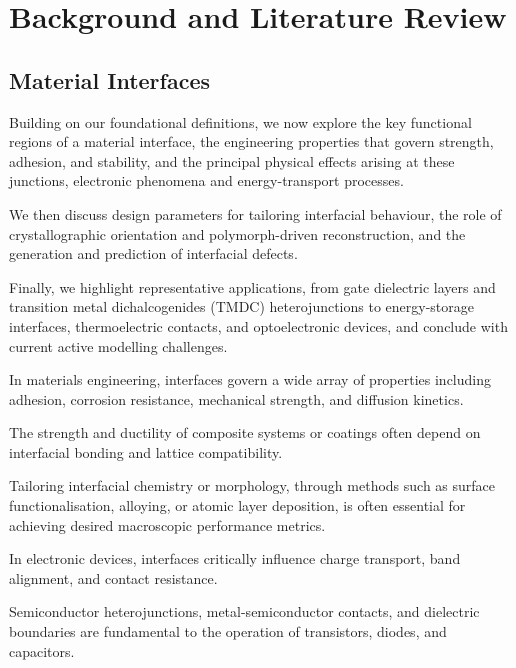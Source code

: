\chapter{Background and Literature Review} \label{chapter:background}

\section{Material Interfaces} \label{section:material_interfaces}

\label{para:interface_section_intro} %

Building on our foundational definitions, we now explore the key functional regions of a material interface, the
engineering properties that govern strength, adhesion, and stability, and the principal physical effects arising at
these junctions, electronic phenomena and energy-transport processes.

We then discuss design parameters for tailoring interfacial behaviour, the role of crystallographic orientation and
polymorph-driven reconstruction, and the generation and prediction of interfacial defects.

Finally, we highlight representative applications, from gate dielectric layers and transition metal dichalcogenides
(TMDC) heterojunctions to energy-storage interfaces, thermoelectric contacts, and optoelectronic devices, and conclude
with current active modelling challenges.

\label{para:interfacial_engineering_properties} %

In materials engineering, interfaces govern a wide array of properties including adhesion, corrosion resistance,
mechanical strength, and diffusion kinetics.

The strength and ductility of composite systems or coatings often depend on interfacial bonding and lattice
compatibility.

Tailoring interfacial chemistry or morphology, through methods such as surface functionalisation, alloying, or atomic
layer deposition, is often essential for achieving desired macroscopic performance metrics.

\label{para:electronic_interface_effects} %

In electronic devices, interfaces critically influence charge transport, band alignment, and contact resistance.

Semiconductor heterojunctions, metal-semiconductor contacts, and dielectric boundaries are fundamental to the operation
of transistors, diodes, and capacitors.

